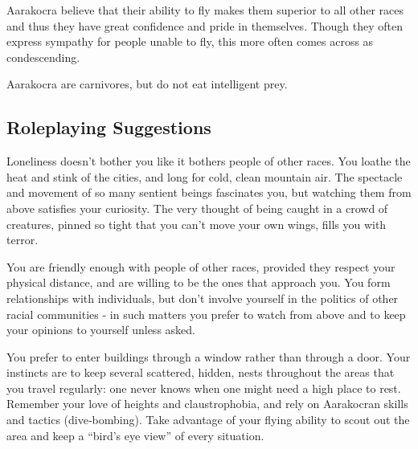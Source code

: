 Aarakocra believe that their ability to fly makes them superior to all other races and thus they have great confidence and pride in themselves. Though they often express sympathy for people unable to fly, this more often comes across as condescending.

Aarakocra are carnivores, but do not eat intelligent prey.
\subsection{Roleplaying Suggestions}
Loneliness doesn't bother you like it bothers people of other races. You loathe the heat and stink of the cities, and long for cold, clean mountain air. The spectacle and movement of so many sentient beings fascinates you, but watching them from above satisfies your curiosity. The very thought of being caught in a crowd of creatures, pinned so tight that you can't move your own wings, fills you with terror.

You are friendly enough with people of other races, provided they respect your physical distance, and are willing to be the ones that approach you. You form relationships with individuals, but don't involve yourself in the politics of other racial communities - in such matters you prefer to watch from above and to keep your opinions to yourself unless asked.

You prefer to enter buildings through a window rather than through a door. Your instincts are to keep several scattered, hidden, nests throughout the areas that you travel regularly: one never knows when one might need a high place to rest. Remember your love of heights and claustrophobia, and rely on Aarakocran skills and tactics (dive‐bombing). Take advantage of your flying ability to scout out the area and keep a ``bird's eye view'' of every situation.

